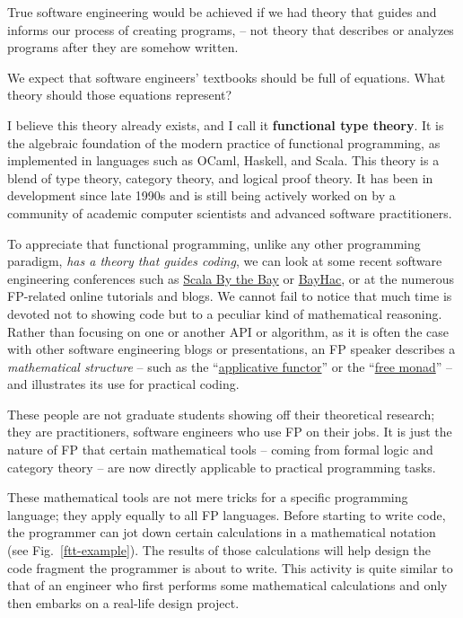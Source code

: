 True software engineering would be achieved if we had theory that
guides and informs our process of creating programs, – not theory
that describes or analyzes programs after they are somehow written.

We expect that software engineers' textbooks should be full of equations.
What theory should those equations represent?

I believe this theory already exists, and I call it \textbf{functional
type theory}. It is the algebraic foundation
of the modern practice of functional programming, as implemented in
languages such as OCaml, Haskell, and Scala. This theory is a blend
of type theory, category theory, and logical proof theory. It has
been in development since late 1990s and is still being actively worked
on by a community of academic computer scientists and advanced software
practitioners.

To appreciate that functional programming, unlike any other programming
paradigm, \emph{has a theory that guides coding}, we can look at some
recent software engineering conferences such as \href{http://2015.scala.bythebay.io/}{Scala By the Bay}
or \href{http://bayhac.org/}{BayHac}, or at the numerous FP-related
online tutorials and blogs. We cannot fail to notice that much time
is devoted not to showing code but to a peculiar kind of mathematical
reasoning. Rather than focusing on one or another API or algorithm,
as it is often the case with other software engineering blogs or presentations,
an FP speaker describes a \emph{mathematical structure} – such as
the ``\href{http://www.youtube.com/watch?v=bmIxIslimVY}{applicative functor}''
or the ``\href{http://www.youtube.com/watch?v=U0lK0hnbc4U}{free monad}''
– and illustrates its use for practical coding.

These people are not graduate students showing off their theoretical
research; they are practitioners, software engineers who use FP on
their jobs. It is just the nature of FP that certain mathematical
tools – coming from formal logic and category theory – are now directly
applicable to practical programming tasks.

These mathematical tools are not mere tricks for a specific programming
language; they apply equally to all FP languages. Before starting
to write code, the programmer can jot down certain calculations in
a mathematical notation (see Fig.\ \ref{ftt-example}). The results
of those calculations will help design the code fragment the programmer
is about to write. This activity is quite similar to that of an engineer
who first performs some mathematical calculations and only then embarks
on a real-life design project.

